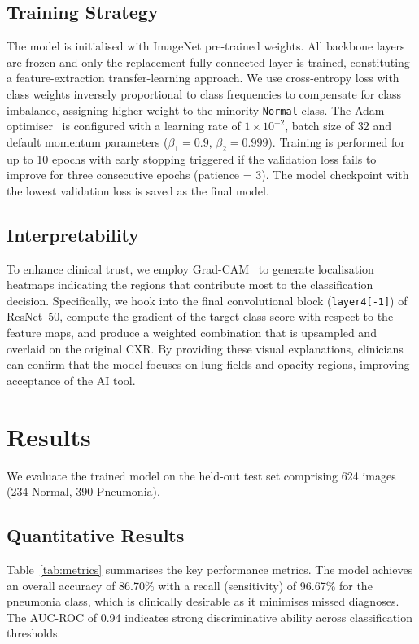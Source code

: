 \documentclass[sigconf]{acmart}
\begin{document}
\subsection{Training Strategy}
\label{sec:training}
The model is initialised with ImageNet pre-trained weights. All backbone layers are frozen and only the replacement fully connected layer is trained, constituting a feature-extraction transfer-learning approach. We use cross-entropy loss with class weights inversely proportional to class frequencies to compensate for class imbalance, assigning higher weight to the minority \texttt{Normal} class. The Adam optimiser~\cite{Kingma2015} is configured with a learning rate of $1 \times 10^{-2}$, batch size of 32 and default momentum parameters ($\beta_1 = 0.9$, $\beta_2 = 0.999$). Training is performed for up to 10 epochs with early stopping triggered if the validation loss fails to improve for three consecutive epochs (patience = 3). The model checkpoint with the lowest validation loss is saved as the final model.

\subsection{Interpretability}
\label{sec:interpretability}
To enhance clinical trust, we employ Grad-CAM~\cite{Selvaraju2017} to generate localisation heatmaps indicating the regions that contribute most to the classification decision. Specifically, we hook into the final convolutional block (\texttt{layer4[-1]}) of ResNet--50, compute the gradient of the target class score with respect to the feature maps, and produce a weighted combination that is upsampled and overlaid on the original CXR. By providing these visual explanations, clinicians can confirm that the model focuses on lung fields and opacity regions, improving acceptance of the AI tool.

\section{Results}
We evaluate the trained model on the held-out test set comprising 624 images (234 Normal, 390 Pneumonia).

\subsection{Quantitative Results}
Table~\ref{tab:metrics} summarises the key performance metrics. The model achieves an overall accuracy of 86.70\% with a recall (sensitivity) of 96.67\% for the pneumonia class, which is clinically desirable as it minimises missed diagnoses. The AUC-ROC of 0.94 indicates strong discriminative ability across classification thresholds.
\end{document}
